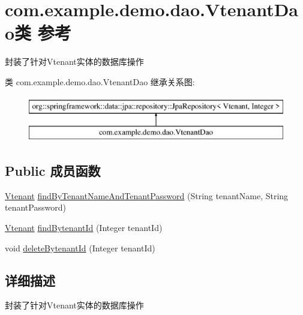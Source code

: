 \hypertarget{interfacecom_1_1example_1_1demo_1_1dao_1_1_vtenant_dao}{}\section{com.\+example.\+demo.\+dao.\+Vtenant\+Dao类 参考}
\label{interfacecom_1_1example_1_1demo_1_1dao_1_1_vtenant_dao}


封装了针对\+Vtenant实体的数据库操作  


类 com.\+example.\+demo.\+dao.\+Vtenant\+Dao 继承关系图\+:\begin{figure}[H]
\begin{center}
\leavevmode
\includegraphics[height=2.000000cm]{interfacecom_1_1example_1_1demo_1_1dao_1_1_vtenant_dao}
\end{center}
\end{figure}
\subsection*{Public 成员函数}
\begin{DoxyCompactItemize}
\item 
\mbox{\hyperlink{classcom_1_1example_1_1demo_1_1modular_1_1_vtenant}{Vtenant}} \mbox{\hyperlink{interfacecom_1_1example_1_1demo_1_1dao_1_1_vtenant_dao_accfcbdd7bf6ae1be3eb8cf1eed105f53}{find\+By\+Tenant\+Name\+And\+Tenant\+Password}} (String tenant\+Name, String tenant\+Password)
\item 
\mbox{\hyperlink{classcom_1_1example_1_1demo_1_1modular_1_1_vtenant}{Vtenant}} \mbox{\hyperlink{interfacecom_1_1example_1_1demo_1_1dao_1_1_vtenant_dao_ab54bf8af5292a2066660fd3a1855ed4a}{find\+Bytenant\+Id}} (Integer tenant\+Id)
\item 
void \mbox{\hyperlink{interfacecom_1_1example_1_1demo_1_1dao_1_1_vtenant_dao_a138c95ae4a3818066257b86ea5422533}{delete\+Bytenant\+Id}} (Integer tenant\+Id)
\end{DoxyCompactItemize}


\subsection{详细描述}
封装了针对\+Vtenant实体的数据库操作 

